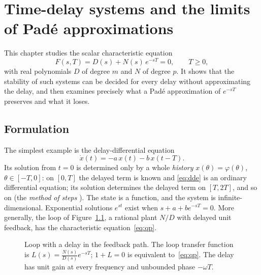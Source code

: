 \chapter{Time-delay systems and the limits of Padé approximations}\label{ch:delay}

This chapter studies the scalar characteristic equation
\begin{equation}
  F(s,T)=D(s)+N(s)\,e^{-sT}=0,\qquad T\ge0,
  \label{eq:qp}
\end{equation}
with real polynomials $D$ of degree $m$ and $N$ of degree $p$. It shows
that the stability of such systems can be decided for every delay without
approximating the delay, and then examines precisely what a Padé
approximation of $e^{-sT}$ preserves and what it loses.

\section{Formulation}

The simplest example is the delay-differential equation
\begin{equation}
  \dot x(t)=-a\,x(t)-b\,x(t-T).
  \label{eq:dde}
\end{equation}
Its solution from $t=0$ is determined only by a whole \emph{history}
$x(\theta)=\varphi(\theta)$, $\theta\in[-T,0]$: on $[0,T]$ the delayed term is
known and \eqref{eq:dde} is an ordinary differential equation; its solution
determines the delayed term on $[T,2T]$, and so on (the \emph{method of
steps} \citep{bellman1963}). The state is a function, and the system is
infinite-dimensional. Exponential solutions $e^{st}$ exist when
$s+a+be^{-sT}=0$. More generally, the loop of Figure~\ref{fig:loop}, a
rational plant $N/D$ with delayed unit feedback, has the characteristic
equation~\eqref{eq:qp}.

\begin{figure}[H]
\centering
{}
\caption{Loop with a delay in the feedback path. The loop transfer function
is $L(s)=\frac{N(s)}{D(s)}e^{-sT}$; $1+L=0$ is equivalent to~\eqref{eq:qp}.
The delay has unit gain at every frequency and unbounded phase $-\omega T$.}
\label{fig:loop}
\end{figure}

